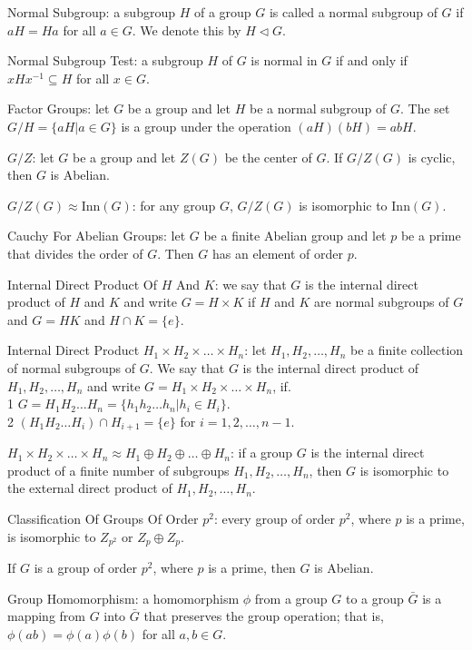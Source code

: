 Normal Subgroup: a subgroup $H$ of a group $G$ is called a normal subgroup of $G$ if $aH=Ha$ for all $a \in G$. We denote this by $H \lhd G$.

Normal Subgroup Test: a subgroup $H$ of $G$ is normal in $G$ if and only if $xHx^{-1} \subseteq H$ for all $x \in G$.

Factor Groups: let $G$ be a group and let $H$ be a normal subgroup of $G$. The set $G/H = \{aH | a \in G \}$ is a group under the operation $(aH)(bH)=abH$.

$G/Z$: let $G$ be a group and let $Z(G)$ be the center of $G$. If $G/Z(G)$ is cyclic, then $G$ is Abelian.

$G/Z(G) \approx \text{Inn}(G)$: for any group $G$, $G/Z(G)$ is isomorphic to $\text{Inn}(G)$.

Cauchy For Abelian Groups: let $G$ be a finite Abelian group and let $p$ be a prime that divides the order of $G$. Then $G$ has an element of order $p$.

Internal Direct Product Of $H$ And $K$: we say that $G$ is the internal direct product of $H$ and $K$ and write $G = H \times K$ if $H$ and $K$ are normal subgroups of $G$ and $G=HK$ and $H \cap K = \{ e \}$.

Internal Direct Product $H_1 \times H_2 \times \dots \times H_n$: let $H_1,H_2,\dots,H_n$ be a finite collection of normal subgroups of $G$. We say that $G$ is the internal direct product of $H_1,H_2,\dots,H_n$ and write $G=H_1 \times H_2 \times \dots \times H_n$, if. \\
1 $G = H_1 H_2 \dots H_n = \{h_1 h_2 \dots h_n | h_i \in H_i \}$. \\
2 $(H_1 H_2 \dots H_i) \cap H_{i+1} = \{ e \}$ for $i = 1,2,\dots,n-1$.

$H_1 \times H_2 \times \dots \times H_n \approx H_1 \oplus H_2 \oplus \dots \oplus H_n$: if a group $G$ is the internal direct product of a finite number of subgroups $H_1,H_2,\dots,H_n$, then $G$ is isomorphic to the external direct product of $H_1,H_2,\dots,H_n$.

Classification Of Groups Of Order $p^2$: every group of order $p^2$, where $p$ is a prime, is isomorphic to $Z_{p^2}$ or $Z_p \oplus Z_p$.

If $G$ is a group of order $p^2$, where $p$ is a prime, then $G$ is Abelian.

Group Homomorphism: a homomorphism $\phi$ from a group $G$ to a group $\bar{G}$ is a mapping from $G$ into $\bar{G}$ that preserves the group operation; that is, $\phi (ab) = \phi (a) \phi (b)$ for all $a,b \in G$.

